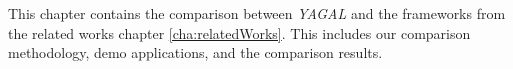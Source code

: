 This chapter contains the comparison between \textit{YAGAL} and the frameworks from the related works chapter \ref{cha:relatedWorks}. This includes our comparison methodology, demo applications, and the comparison results.
 